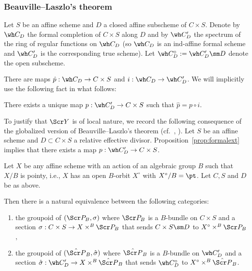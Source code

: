 \subsubsection{Beauville--Laszlo's theorem} \label{sect:BLthm}
Let $S$ be an affine scheme and $D$ a closed affine subscheme of $C\times S$.
Denote by $\wh C_D$ the formal completion of $C\times S$ along $D$ and by
$\wh C'_D$ the spectrum of the ring of regular functions on $\wh C_D$ (so $\wh C_D$ is an ind-affine formal scheme and $\wh C'_D$ is the corresponding true scheme).
Let $\wh C^\circ_D := \wh C'_D \sm D$ denote the open subscheme.

There are maps $\hat p: \wh C_D \to C\times S$ and $i: \wh C_D \to \wh C'_D$.
We will implicitly use the following fact in what follows:

\begin{prop}[{\cite[Proposition 2.12.6]{BD}}]
\notready \label{prop:formalext}
There exists a unique map
$p : \wh C'_D \to C\times S$ such that $\hat p = p\circ i$.
\end{prop}


To justify that $\Scr Y$ is of local nature, we record
the following consequence of the globalized version of Beauville--Laszlo's theorem (cf.~\cite[Theorem 2.12.1]{BD}, \cite{BLa}).
Let $S$ be an affine scheme and $D\subset C\times S$ a relative effective divisor.
Proposition~\ref{prop:formalext} implies that there exists a map $p:\wh C'_D\to C\times S$.

\begin{lem}
\notready \label{lem:B-L}
Let $X$ be any affine scheme with an action of an algebraic group $B$
such that $X/B$ is pointy, i.e., $X$ has an open $B$-orbit $X^\circ$ with $X^\circ/B=\pt$.
Let $C,S$ and $D$ be as above.

Then there is a natural equivalence between the following categories:
\begin{enumerate}
\item the groupoid of $(\Scr P_B, \sigma)$ where $\Scr P_B$ is a $B$-bundle on $C\times S$ and a section $\sigma : C\times S \to X\times^B \Scr P_B$
that sends $C\times S\sm D$ to $X^\circ \times^B \Scr P_B$,
\item the groupoid of $(\hat{\Scr P}_B, \hat \sigma)$ where $\hat{\Scr P}_B$ is a $B$-bundle on $\wh C'_D$ and a section $\hat\sigma: \wh C'_D \to X\times^B \hat{\Scr P}_B$ that sends $\wh C^\circ_D$ to $X^\circ \times^B \hat{\Scr P}_B$.
\end{enumerate}
\end{lem}

